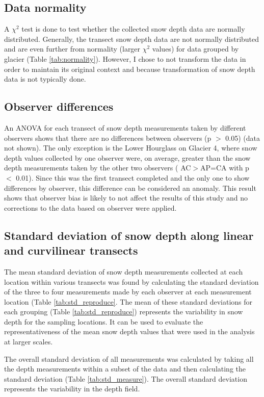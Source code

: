 \documentclass{sfuthesis}
\begin{document}
\begin{appendices}
\subsection{Data normality}

A $\chi^2$ test is done to test whether the collected snow depth data are normally distributed. Generally, the transect snow depth data are not normally distributed and are even further from normality (larger $\chi^2$ values) for data grouped by glacier (Table \ref{tab:normality}). However, I chose to not transform the data in order to maintain its original context and because transformation of snow depth data is not typically done.  

\subsection{Observer differences}

An ANOVA for each transect of snow depth measurements taken by different observers shows that there are no differences between observers (p $>$ 0.05) (data not shown). The only exception is the Lower Hourglass on Glacier 4, where snow depth values collected by one observer were, on average, greater than the snow depth measurements taken by the other two observers ( AC$>$AP=CA with p $<$ 0.01). Since this was the first transect completed and the only one to show differences by observer, this difference can be considered an anomaly. This result shows that observer bias is likely to not affect the results of this study and no corrections to the data based on observer were applied.

\subsection{Standard deviation of snow depth along linear and curvilinear transects}
\label{sec:stdTransects}

The mean standard deviation of snow depth measurements collected at each location within various transects was found by calculating the standard deviation of the three to four measurements made by each observer at each measurement location (Table \ref{tab:std_reproduce}. The mean of these standard deviations for each grouping (Table \ref{tab:std_reproduce}) represents the variability in snow depth for the sampling locations. It can be used to evaluate the representativeness of the mean snow depth values that were used in the analysis at larger scales.

The overall standard deviation of all measurements was calculated by taking all the depth measurements within a subset of the data and then calculating the standard deviation (Table \ref{tab:std_measure}). The overall standard deviation represents the variability in the depth field. 


\end{appendices}
\end{document}

